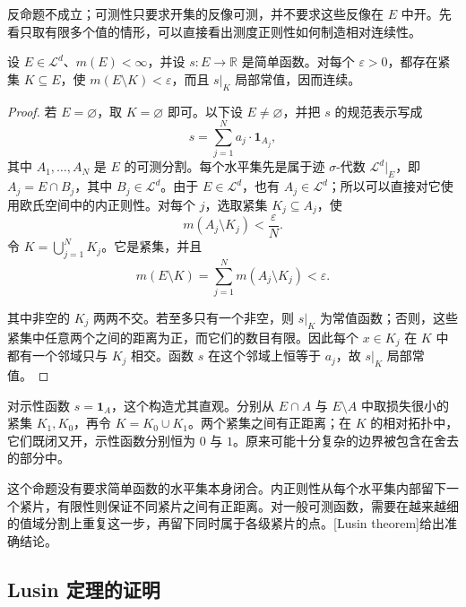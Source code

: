 反命题不成立；可测性只要求开集的反像可测，并不要求这些反像在 \(E\) 中开。先看只取有限多个值的情形，可以直接看出测度正则性如何制造相对连续性。

\begin{proposition}
\label{b1:prop:simple-function-lusin}
设 \(E\in\mathcal L^d\)、\(m(E)<\infty\)，并设
\(s:E\rightarrow\mathbb R\) 是简单函数。对每个 \(\varepsilon>0\)，都存在紧集
\(K\subseteq E\)，使 \(m(E\setminus K)<\varepsilon\)，而且 \(s|_K\) 局部常值，因而连续。
\end{proposition}
\begin{proof}
若 \(E=\varnothing\)，取 \(K=\varnothing\) 即可。以下设 \(E\ne\varnothing\)，并把 \(s\) 的规范表示写成
\[
s=\sum_{j=1}^{N}a_j\cdot\mathbf 1_{A_j},
\]
其中 \(A_1,\ldots,A_N\) 是 \(E\) 的可测分割。每个水平集先是属于迹 \(\sigma\)-代数 \(\mathcal L^d|_E\)，即 \(A_j=E\cap B_j\)，其中 \(B_j\in\mathcal L^d\)。由于 \(E\in\mathcal L^d\)，也有 \(A_j\in\mathcal L^d\)；所以可以直接对它使用欧氏空间中的内正则性。对每个 \(j\)，选取紧集 \(K_j\subseteq A_j\)，使
\[
m(A_j\setminus K_j)<\frac{\varepsilon}{N}.
\]
令 \(K=\bigcup_{j=1}^{N}K_j\)。它是紧集，并且
\[
m(E\setminus K)
=\sum_{j=1}^{N}m(A_j\setminus K_j)<\varepsilon.
\]

其中非空的 \(K_j\) 两两不交。若至多只有一个非空，则 \(s|_K\) 为常值函数；否则，这些紧集中任意两个之间的距离为正，而它们的数目有限。因此每个 \(x\in K_j\) 在 \(K\) 中都有一个邻域只与 \(K_j\) 相交。函数 \(s\) 在这个邻域上恒等于 \(a_j\)，故 \(s|_K\) 局部常值。
\end{proof}

对示性函数 \(s=\mathbf 1_A\)，这个构造尤其直观。分别从
\(E\cap A\) 与 \(E\setminus A\) 中取损失很小的紧集 \(K_1,K_0\)，再令
\(K=K_0\cup K_1\)。两个紧集之间有正距离；在 \(K\) 的相对拓扑中，它们既闭又开，示性函数分别恒为 \(0\) 与 \(1\)。原来可能十分复杂的边界被包含在舍去的部分中。

\ProseParagraphBreak

这个命题没有要求简单函数的水平集本身闭合。内正则性从每个水平集内部留下一个紧片，有限性则保证不同紧片之间有正距离。对一般可测函数，需要在越来越细的值域分割上重复这一步，再留下同时属于各级紧片的点。[Lusin theorem]给出准确结论。

\subsection{Lusin 定理的证明}
\label{b1:subsec:040402}

